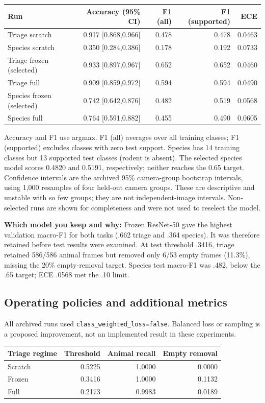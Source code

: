 \documentclass[11pt,a4paper]{article}
\begin{document}
\smallskip
{\small
\begin{tabularx}{\linewidth}{@{}Y r r r r@{}}
\toprule
Run & Accuracy (95\% CI) & F1 (all) & F1 (supported) & ECE \\
\midrule
Triage scratch & 0.917 [0.868,0.966] & 0.478 & 0.478 & 0.0463 \\
Species scratch & 0.350 [0.284,0.386] & 0.178 & 0.192 & 0.0733 \\
Triage frozen (selected) & 0.933 [0.897,0.967] & 0.652 & 0.652 & 0.0460 \\
Triage full & 0.909 [0.859,0.972] & 0.594 & 0.594 & 0.0490 \\
Species frozen (selected) & 0.742 [0.642,0.876] & 0.482 & 0.519 & 0.0568 \\
Species full & 0.764 [0.591,0.882] & 0.455 & 0.490 & 0.0605 \\
\bottomrule
\end{tabularx}}
\smallskip
Accuracy and F1 use argmax. F1 (all) averages over all training classes; F1 (supported) excludes classes with zero test support. Species has 14 training classes but 13 supported test classes (rodent is absent). The selected species model scores 0.4820 and 0.5191, respectively; neither reaches the 0.65 target.
Confidence intervals are the archived 95\% camera-group bootstrap intervals, using 1,000 resamples of four held-out camera groups. These are descriptive and unstable with so few groups; they are not independent-image intervals. Non-selected runs are shown for completeness and were not used to reselect the model.

\smallskip
\textbf{Which model you keep and why:} Frozen ResNet-50 gave the highest validation macro-F1 for both tasks (.662 triage and .364 species). It was therefore retained before test results were examined. At test threshold .3416, triage retained 586/586 animal frames but removed only 6/53 empty frames (11.3\%), missing the 20\% empty-removal target. Species test macro-F1 was .482, below the .65 target; ECE .0568 met the .10 limit.

\subsection{Operating policies and additional metrics}
All archived runs used \texttt{class\_weighted\_loss=false}. Balanced loss or sampling is a proposed improvement, not an implemented result in these experiments.

\begin{tabularx}{\linewidth}{@{}Y r r r@{}}
\toprule
Triage regime & Threshold & Animal recall & Empty removal \\
\midrule
Scratch & 0.5225 & 1.0000 & 0.0000 \\
Frozen & 0.3416 & 1.0000 & 0.1132 \\
Full & 0.2173 & 0.9983 & 0.0189 \\
\bottomrule
\end{tabularx}
\end{document}
